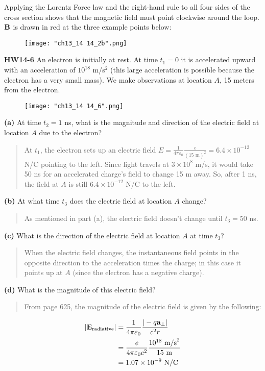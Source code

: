 \documentclass{article}
\begin{document}
Applying the Lorentz Force law and the right-hand rule to all four sides of the cross section shows that the magnetic field must point clockwise around the loop. $\vb{B}$ is drawn in red at the three example points below:

\begin{figure}[H]
	\centering
	\texttt{[image: "ch13\_14 14\_2b".png]}
\end{figure}
\pagebreak

\textbf{HW14-6} An electron is initially at rest. At time $t_1 = 0$ it is accelerated upward with an acceleration of $10^{18}$ m/s$^2$ (this large acceleration is possible because the electron has a very small mass). We make observations at location $A$, 15 meters from the electron.
\begin{figure}[H]
	\centering
	\texttt{[image: "ch13\_14 14\_6".png]}
\end{figure}
\textbf{(a)} At time $t_2 = 1$ ns, what is the magnitude and direction of the electric field at location $A$ due to the electron?
\begin{quote}
At $t_1$, the electron sets up an electric field $E = \frac{1}{4\pi\varepsilon_0}\frac{e}{(15\text{ m})^2} = 6.4\times10^{-12}$ N/C pointing to the left. Since light travels at $3\times 10^8$ m/s, it would take 50 ns for an accelerated charge's field to change 15 m away. So, after 1 ns, the field at $A$ is still $6.4\times10^{-12}$ N/C to the left.
\end{quote}

\textbf{(b)} At what time $t_3$ does the electric field at location $A$ change?
\begin{quote}
As mentioned in part (a), the electric field doesn't change until $t_3 = 50$ ns.
\end{quote}

\textbf{(c)} What is the direction of the electric field at location $A$ at time $t_3$?
\begin{quote}
When the electric field changes, the instantaneous field points in the opposite direction to the acceleration times the charge; in this case it points up at $A$ (since the electron has a negative charge).
\end{quote}

\textbf{(d)} What is the magnitude of this electric field?
\begin{quote}
From page 625, the magnitude of the electric field is given by the following:
\end{quote}
\begin{equation*}
\begin{aligned}
\left|\vb{E}_{\text{radiative}}\right| &= \frac{1}{4\pi\varepsilon_0}\frac{|-q\vb{a}_\perp|}{c^2r} \\
&= \frac{e}{4\pi\varepsilon_0c^2}\frac{10^{18}\text{ m/s}^2}{15\text{ m}} \\
&= 1.07\times 10^{-9}\text{ N/C}
\end{aligned}
\end{equation*}
\end{document}
